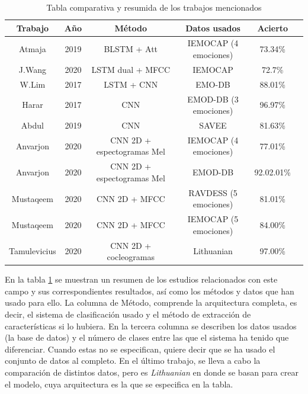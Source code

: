 \documentclass[11pt,a4paper,spanish]{book}
\begin{document}
	\begin{table}[H]
		\centering
		\begin{center}
			\begin{tabular}{| c | c | c | c| c | c|}
				\hline
					Trabajo & Año & Método &  Datos usados  & Acierto \\ 
				\hline
					Atmaja & 2019 &   BLSTM + Att  & IEMOCAP (4 emociones) & 73.34\% 	\\
					J.Wang & 2020 & LSTM dual + MFCC & IEMOCAP & 72.7\% \\
					W.Lim & 2017 &   LSTM + CNN & EMO-DB &  88.01\%		\\ 
					Harar & 2017 &  CNN & EMOD-DB (3 emociones) &  96.97\%			\\
					Abdul & 2019 & CNN & SAVEE & 81.63\%				\\
					Anvarjon & 2020 & CNN 2D + espectogramas Mel & IEMOCAP (4 emociones) & 77.01\%\\
					Anvarjon & 2020 & CNN 2D + espectogramas Mel & EMOD-DB & 92.02.01\%\\
					Mustaqeem & 2020 & CNN 2D + MFCC & RAVDESS (5 emociones) & 81.01\% \\
					Mustaqeem & 2020 & CNN 2D + MFCC & IEMOCAP (5 emociones) & 84.00\% \\  
					Tamulevicius & 2020 & CNN 2D + cocleogramas & Lithuanian & 97.00\% \\
				\hline	
			\end{tabular}
		
			\caption{Tabla comparativa y resumida de los trabajos mencionados}
			\label{tab:metod_comp}
		\end{center}
	\end{table}

	En la tabla \ref{tab:metod_comp} se muestran un resumen de los estudios relacionados con este campo y sus correspondientes resultados, así como los métodos y datos que han usado para ello. La columna de Método, comprende la arquitectura completa, es decir, el sistema de clasificación usado y el método de extracción de características si lo hubiera. En la tercera columna se describen los datos usados (la base de datos) y el número de clases entre las que el sistema ha tenido que diferenciar. Cuando estas no se especifican, quiere decir que se ha usado el conjunto de datos al completo.
	En el último trabajo, \cite{Tamulevicius2020} se lleva a cabo la comparación de distintos datos, pero es \emph{Lithuanian} en donde se basan para crear el modelo, cuya arquitectura es la que se especifica en la tabla.\\
	
\end{document}
